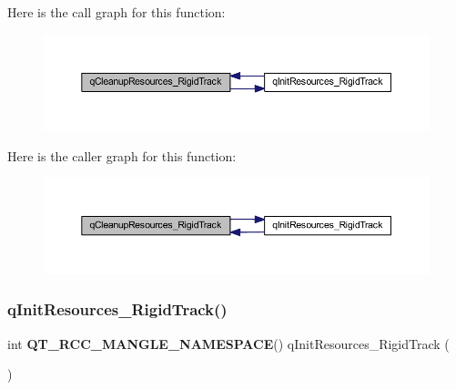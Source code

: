 Here is the call graph for this function\+:\nopagebreak
\begin{figure}[H]
\begin{center}
\leavevmode
\includegraphics[width=350pt]{qrc___rigid_track_8cpp_a7bd81c1f1b527e9e3131419c67ffbf82_cgraph}
\end{center}
\end{figure}
Here is the caller graph for this function\+:\nopagebreak
\begin{figure}[H]
\begin{center}
\leavevmode
\includegraphics[width=350pt]{qrc___rigid_track_8cpp_a7bd81c1f1b527e9e3131419c67ffbf82_icgraph}
\end{center}
\end{figure}
\mbox{\label{qrc___rigid_track_8cpp_a656c2fbf750a7410f65e97f1dba0ac91}} 
\subsubsection{q\+Init\+Resources\+\_\+\+Rigid\+Track()}
{\footnotesize\ttfamily int \textbf{ Q\+T\+\_\+\+R\+C\+C\+\_\+\+M\+A\+N\+G\+L\+E\+\_\+\+N\+A\+M\+E\+S\+P\+A\+CE}() q\+Init\+Resources\+\_\+\+Rigid\+Track (\begin{DoxyParamCaption}{ }\end{DoxyParamCaption})}

